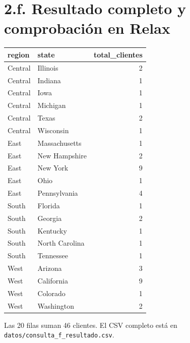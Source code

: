 \section*{2.f. Resultado completo y comprobación en Relax}
\begin{center}\small\begin{tabular}{llr}\toprule\rowcolor{Fondo}
region & state & total\_clientes\\\midrule
Central & Illinois & 2\\
Central & Indiana & 1\\
Central & Iowa & 1\\
Central & Michigan & 1\\
Central & Texas & 2\\
Central & Wisconsin & 1\\
East & Massachusetts & 1\\
East & New Hampshire & 2\\
East & New York & 9\\
East & Ohio & 1\\
East & Pennsylvania & 4\\
South & Florida & 1\\
South & Georgia & 2\\
South & Kentucky & 1\\
South & North Carolina & 1\\
South & Tennessee & 1\\
West & Arizona & 3\\
West & California & 9\\
West & Colorado & 1\\
West & Washington & 2\\\bottomrule
\end{tabular}\end{center}
\begin{center}
\begin{minipage}{.48\linewidth}\end{minipage}\hfill
\begin{minipage}{.48\linewidth}\end{minipage}
\end{center}
Las 20 filas suman 46 clientes. El CSV completo está en \texttt{datos/consulta\_f\_resultado.csv}.

\clearpage
